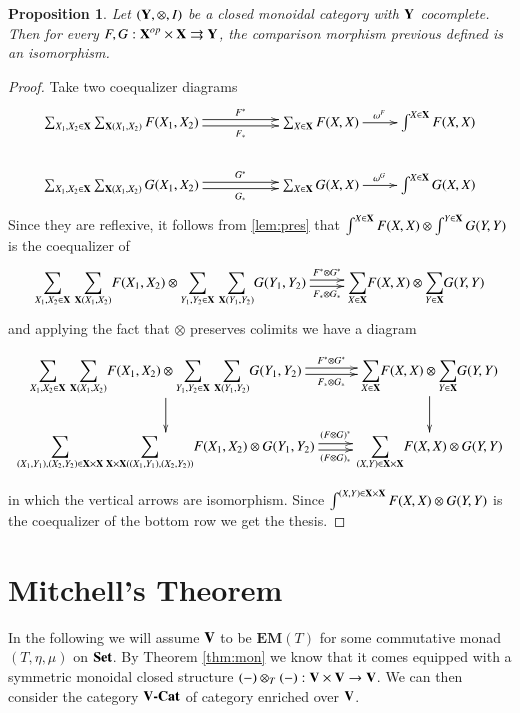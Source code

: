 \documentclass[12pt]{article}
\newtheorem{proposition}[lemma]{Proposition}
\theoremstyle{definition}
\newcommand{\Sum}{\mathlarger{\sum}}
\newcommand{\Set}{\textbf{\textup{Set}}}
\newcommand{\eim}[1]{\mathbf{EM}{(#1)}}
\numberwithin{equation}{section}
\newcommand{\vcat}{\V\textbf{\textup{-Cat}}}
\def\X{\textbf {\textup{X}}}
\def\V{\textbf {\textup{V}}}
\def\Y{\textbf {\textup{Y}}}
\begin{document}
\begin{proposition}\label{cor:refcoeq}
	Let $(\Y, \otimes, I)$ be a closed monoidal category with $\Y$ cocomplete. Then for every $F, G:\X^{op}\times \X \rightrightarrows \Y$, the comparison morphism previous defined is an isomorphism.
\end{proposition}
	\begin{proof}Take two coequalizer diagrams
	\[\xymatrix{ \sum_{X_1, X_2\in \X} \sum_{\X(X_1, X_2)}  F(X_1, X_2) \ar@<.5ex>[rr]^-{F^*} \ar@<-.5ex>[rr]_-{F_*}&& \sum_{X\in \X} F(X, X) \ar[r]^{\omega^F}& \int^{X\in \X} F(X,X) \\ \sum_{X_1, X_2\in \X} \sum_{\X(X_1, X_2)}  G(X_1, X_2) \ar@<.5ex>[rr]^-{G^*} \ar@<-.5ex>[rr]_-{G_*}&& \sum_{X\in \X} G(X, X) \ar[r]^{\omega^G}& \int^{X\in \X} G(X,X) }\] 
	Since they are reflexive, it follows from \ref{lem:pres}
 that $\int^{X\in \X}F(X,X) \otimes \int^{Y\in \X} G(Y,Y)$	is the coequalizer of 
\[\xymatrix{ \Sum\limits_{X_1, X_2\in \X} \hspace{3pt}\Sum\limits_{\X(X_1, X_2)}  F(X_1, X_2) \otimes \Sum\limits_{Y_1, Y_2\in \X} \hspace{3pt} \Sum\limits_{\X(Y_1, Y_2)}  G(Y_1, Y_2) \ar@<.5ex>[r]^-{F^*\otimes G^*} \ar@<-.5ex>[r]_-{F_*\otimes G_*} & \Sum\limits_{X\in \X} F(X, X) \otimes \Sum\limits_{Y\in \X} G(Y, Y) }\]
and applying the fact that $\otimes$ preserves colimits  we have a diagram

\[\xymatrix{ \Sum\limits_{X_1, X_2\in \X} \hspace{3pt}\Sum\limits_{\X(X_1, X_2)}  F(X_1, X_2) \otimes \Sum\limits_{Y_1, Y_2\in \X} \hspace{3pt} \Sum\limits_{\X(Y_1, Y_2)}  G(Y_1, Y_2)  \ar[d] \ar@<.5ex>[r]^-{F^*\otimes G^*} \ar@<-.5ex>[r]_-{F_*\otimes G_*} & \Sum\limits_{X\in \X} F(X, X) \ar[d] \otimes \Sum\limits_{Y\in \X} G(Y, Y) \\ \Sum\limits_{(X_1, Y_1), (X_2, Y_2) \in \X\times \X} \hspace{2pt}  \Sum\limits_{\X\times \X((X_1, Y_1), (X_2, Y_2))} F(X_1, X_2) \otimes G(Y_1, Y_2) \ar@<.5ex>[r]^-{(F\otimes G)^*}\ar@<-.5ex>[r]_-{(F\otimes G)_*}  & \Sum\limits_{(X, Y)\in \X\times \X} F(X,X)\otimes G(Y,Y)}\]

in which the vertical arrows are isomorphism. Since $\int^{(X,Y)\in \X\times \X} F(X,X)\otimes G(Y,Y) $ is the coequalizer of the bottom row we get the thesis.
\end{proof}
	\section{Mitchell's  Theorem}
	In the following we will assume $\V$ to be $\eim{T}$ for some commutative monad $(T, \eta, \mu)$ on $\Set$. By Theorem \ref{thm:mon} we know that it comes equipped with a symmetric monoidal closed structure $(-)\otimes_T (-):\V\times \V\to \V$. We can then consider the category $\vcat$ of category enriched over $\V$.
	
\end{document}
